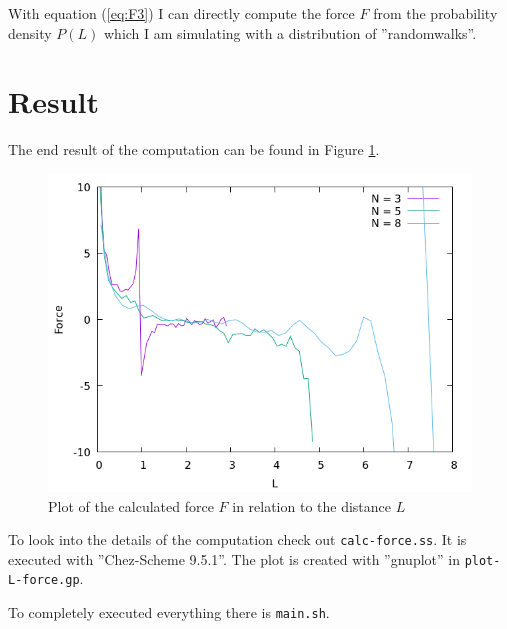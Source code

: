 \documentclass[a4paper,12pt]{scrartcl}
\begin{document}
With equation (\ref{eq:F3}) I can directly compute the force $F$ from the probability density $P(L)$ which I am simulating with a distribution of ''randomwalks''.

\section{Result}
The end result of the computation can be found in Figure \ref{fig:1}.

\begin{figure}[h]
	\centering
	\includegraphics[scale=0.65]{../out/plot-L-force.png}
	\caption{Plot of the calculated force $F$ in relation to the distance $L$}
	\label{fig:1}
\end{figure}

To look into the details of the computation check out \texttt{calc-force.ss}. It is executed with ''Chez-Scheme 9.5.1''.
The plot is created with ''gnuplot'' in \texttt{plot-L-force.gp}.

To completely executed everything there is \texttt{main.sh}.
\end{document}
